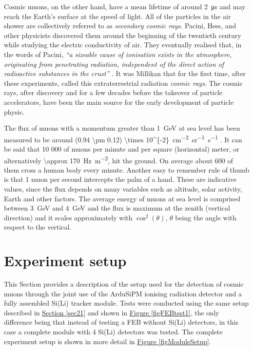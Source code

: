 \par
Cosmic muons, on the other hand, have a mean lifetime of around \SI{2}{\micro\second} and may reach the Earth's surface at the speed of light. All of the particles in the air shower are collectively referred to as \textit{secondary cosmic rays}. Pacini, Hess, and other physicists discovered them around the beginning of the twentieth century while studying the electric conductivity of air. They eventually realised that, in the words of Pacini, \textit{``a sizeable cause of ionisation exists in the atmosphere, originating from penetrating radiation, independent of the direct action of radioactive substances in the crust''} \cite{deangelis_2012_domenico, alessandrodeangelis_2012_lenigma}. It was Millikan that for the first time, after these experiments, called this extraterrestrial radiation \textit{cosmic rays}.  The cosmic rays, after discovery and for a few decades before the takeover of particle accelerators, have been the main source for the early development of particle physic.

\par
The flux of muons with a momentum greater than \SI{1}{\giga\electronvolt} at sea level has been measured to be around \SI[parse-numbers=false]{(0.94 \pm 0.12) \times 10^{-2}}{\cm^{-2}.sr^{-1}.s^{-1}} \cite{tanabashi_2018_review, allkofer_1975_the}. It can be said that 10 000 of muons per minute and per square (horizontal) meter, or alternatively \SI{\approx 170}{\hertz\per\meter^{2}}, hit the ground. On average about 600 of them cross a human body every minute. Another easy to remember rule of thumb is that 1 muon per second intercepts the palm of a hand. These are indicative values, since the flux depends on many variables such as altitude, solar activity, Earth and other factors. The average energy of muons at sea level is comprised between \SI{3}{\giga\electronvolt} and \SI{4}{\giga\electronvolt} and the flux is maximum
at the zenith (vertical direction) and it scales approximately with $\cos^{2}(\theta)$, $\theta$ being the angle with respect to the vertical.


\section{Experiment setup}

This Section provides a description of the setup used for the detection of cosmic muons through the joint use of the ArduSiPM ionising radiation detector and a fully assembled Si(Li) tracker module. Tests were conducted using the same setup described in \hyperref[sec21]{Section \ref{sec21}} and shown in \hyperref[figFEBtest1]{Figure \ref{figFEBtest1}}, the only difference being that instead of testing a FEB without Si(Li) detectors, in this case a complete module with 4 Si(Li) detectors was tested. The complete experiment setup is shown in more detail in \hyperref[figModuleSetup]{Figure \ref{figModuleSetup}}.

